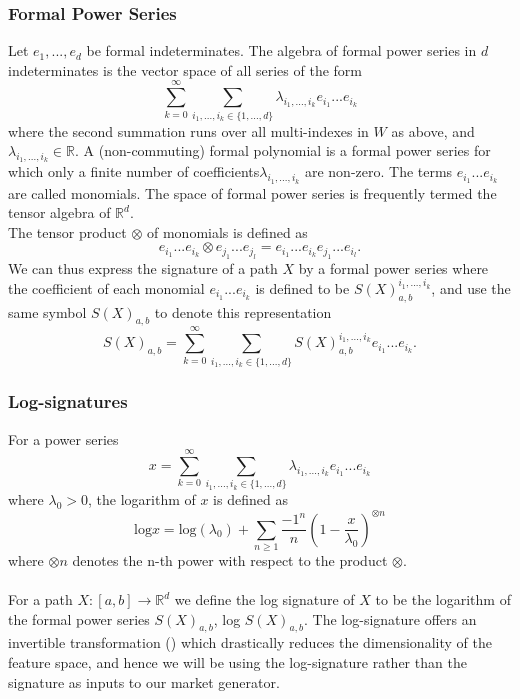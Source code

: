 \documentclass{article}
\theoremstyle{definition}
\begin{document}
\subsubsection{Formal Power Series}
Let $e_{1},...,e_{d}$ be formal indeterminates. The algebra of formal power series in $d$ indeterminates is the vector space of all series of the form $$\sum_{k=0}^{\infty} \sum_{i_{1},...,i_{k}\in \{1,...,d\}} \lambda_{i_{1},...,i_{k}}e_{i_{1}}...e_{i_{k}}$$ where the second summation runs over all multi-indexes in $W$ as above, and $\lambda_{i_{1},...,i_{k}} \in \mathbb{R}$. A (non-commuting) formal polynomial is a formal power series for which only a finite number of coefficients$\lambda_{i_{1},...,i_{k}}$ are non-zero. The terms $e_{i_{1}}...e_{i_{k}}$ are called monomials. The space of formal power series is frequently termed the tensor algebra of $\mathbb{R}^{d}$.\\
The tensor product $\otimes$ of monomials is defined as $$e_{i_{1}}...e_{i_{k}} \otimes e_{j_{1}}...e_{j_{l}} = e_{i_{1}}...e_{i_{k}}e_{j_{1}}...e_{i_{l}}.$$
We can thus express the signature of a path $X$ by a formal power series where the coefficient of each monomial $e_{i_{1}}...e_{i_{k}}$ is defined to be $S(X)_{a,b}^{i_{1},...,i_{k}}$, and use the same symbol $S(X)_{a,b}$ to denote this representation $$S(X)_{a,b}=\sum_{k=0}^{\infty} \sum_{i_{1},...,i_{k}\in \{1,...,d\}} S(X)_{a,b}^{i_{1},...,i_{k}}e_{i_{1}}...e_{i_{k}}.$$

\subsubsection{Log-signatures}
For a power series $$x =\sum_{k=0}^{\infty} \sum_{i_{1},...,i_{k}\in \{1,...,d\}} \lambda_{i_{1},...,i_{k}}e_{i_{1}}...e_{i_{k}}$$ where $\lambda_{0}>0$, the logarithm of $x$ is defined as $$\text{log}x = \text{log}(\lambda_{0}) + \sum_{n\geq{1}}\frac{{-1}^{n}}{n}\left(1-\frac{x}{\lambda_{0}}\right)^{\otimes n}$$ where $\otimes n$ denotes the n-th power with respect to the product $\otimes.$\\\\
For a path $X:[a,b] \rightarrow \mathbb{R}^{d}$ we define the log signature of $X$ to be the logarithm of the formal power series $S(X)_{a,b}$, log $S(X)_{a,b}.$
The log-signature offers an invertible transformation (\cite{zhou2019signatures}) which drastically reduces the dimensionality of the feature space, and hence we will be using the log-signature rather than the signature as inputs to our market generator.
\end{document}
